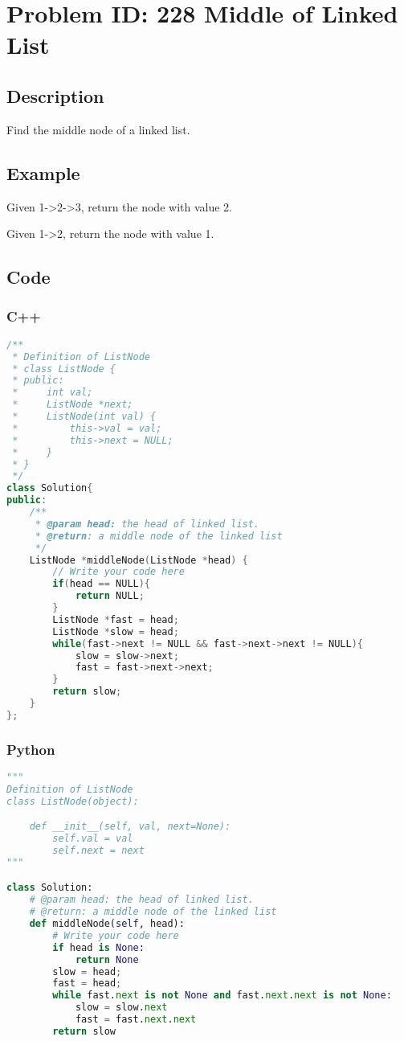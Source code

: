 \section{Problem ID: 228 Middle of Linked List}
\subsection{Description}
Find the middle node of a linked list.

\subsection{Example}
Given 1->2->3, return the node with value 2.

Given 1->2, return the node with value 1.

\subsection{Code}
\scriptsize
\subsubsection{C++}
\begin{lstlisting}[language=C++]
/**
 * Definition of ListNode
 * class ListNode {
 * public:
 *     int val;
 *     ListNode *next;
 *     ListNode(int val) {
 *         this->val = val;
 *         this->next = NULL;
 *     }
 * }
 */
class Solution{
public:
    /**
     * @param head: the head of linked list.
     * @return: a middle node of the linked list
     */
    ListNode *middleNode(ListNode *head) {
        // Write your code here
        if(head == NULL){
            return NULL;
        }
        ListNode *fast = head;
        ListNode *slow = head;
        while(fast->next != NULL && fast->next->next != NULL){
            slow = slow->next;
            fast = fast->next->next;
        }
        return slow;
    }
};
\end{lstlisting}

\subsubsection{Python}
\begin{lstlisting}[language=Python]
"""
Definition of ListNode
class ListNode(object):

    def __init__(self, val, next=None):
        self.val = val
        self.next = next
"""

class Solution:
    # @param head: the head of linked list.
    # @return: a middle node of the linked list
    def middleNode(self, head):
        # Write your code here
        if head is None:
            return None
        slow = head;
        fast = head;
        while fast.next is not None and fast.next.next is not None:
            slow = slow.next
            fast = fast.next.next
        return slow
\end{lstlisting}